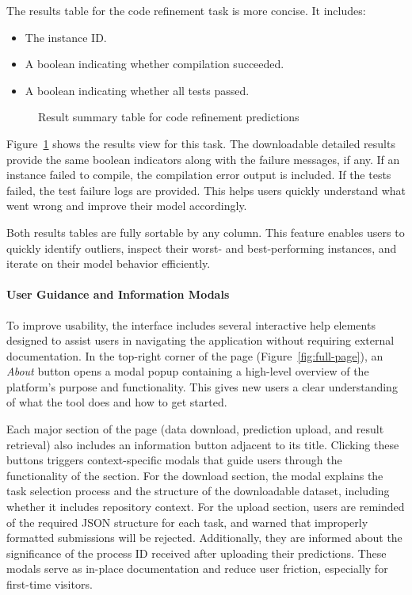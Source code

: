 The results table for the code refinement task is more concise. It includes:
\begin{itemize}
	\item The instance ID.
	\item A boolean indicating whether compilation succeeded.
	\item A boolean indicating whether all tests passed.
\end{itemize}

\begin{figure}[H]
	\centering
	\caption{Result summary table for code refinement predictions}
	\label{fig:refinement-table}
\end{figure}

Figure~\ref{fig:refinement-table} shows the results view for this task. The downloadable detailed
results provide the same boolean indicators along with the failure messages, if any. If an instance
failed to compile, the compilation error output is included. If the tests failed, the test failure
logs are provided. This helps users quickly understand what went wrong and improve their model
accordingly.

Both results tables are fully sortable by any column. This feature enables users to quickly identify
outliers, inspect their worst- and best-performing instances, and iterate on their model behavior
efficiently.

\paragraph{User Guidance and Information Modals}

To improve usability, the interface includes several interactive help elements designed to assist
users in navigating the application without requiring external documentation. In the top-right
corner of the page (Figure~\ref{fig:full-page}), an \textit{About} button opens a modal popup
containing a high-level overview of the platform's purpose and functionality. This gives new users a
clear understanding of what the tool does and how to get started.

Each major section of the page (data download, prediction upload, and result retrieval) also
includes an information button adjacent to its title. Clicking these buttons triggers
context-specific modals that guide users through the functionality of the section. For the download
section, the modal explains the task selection process and the structure of the downloadable
dataset, including whether it includes repository context. For the upload section, users are
reminded of the required JSON structure for each task, and warned that improperly formatted
submissions will be rejected. Additionally, they are informed about the significance of the process
ID received after uploading their predictions. These modals serve as in-place documentation and
reduce user friction, especially for first-time visitors.


